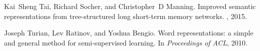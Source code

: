 \documentclass{article}
\begin{document}
\begin{thebibliography}{}
Kai~Sheng Tai, Richard Socher, and Christopher~D Manning.
\newblock Improved semantic representations from tree-structured long
  short-term memory networks.
, 2015.

Joseph Turian, Lev Ratinov, and Yoshua Bengio.
\newblock Word representations: a simple and general method for semi-supervised
  learning.
\newblock In {\em Proceedings of ACL}, 2010.

\end{thebibliography}
\end{document}
